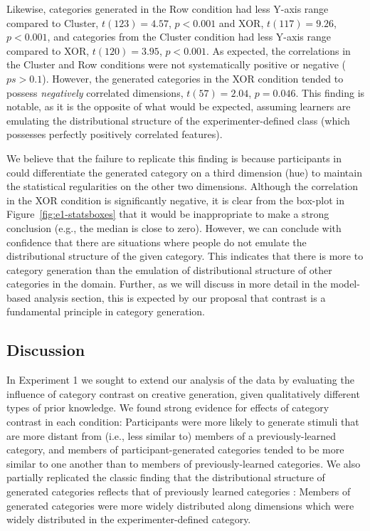 \documentclass[12pt]{article}
\begin{document}
\begin{flushleft}
Likewise, categories generated in the Row condition had less Y-axis range compared to Cluster, $t(123) = 4.57$, $p < 0.001$ and XOR, $t(117) = 9.26$, $p < 0.001$, and categories from the Cluster condition had less Y-axis range compared to XOR, $t(120) = 3.95$, $p < 0.001$. As expected, the correlations in the Cluster and Row conditions were not systematically positive or negative ($ps > 0.1$). However, the generated categories in the XOR condition tended to possess {\em negatively} correlated dimensions, $t(57) = 2.04$, $p = 0.046$. This finding is notable, as it is the opposite of what would be expected, assuming learners are emulating the distributional structure of the experimenter-defined class (which possesses perfectly positively correlated features). 

We believe that the failure to replicate this finding is because participants in \cite{jern2013probabilistic} could differentiate the generated category on a third dimension (hue) to maintain the statistical regularities on the other two dimensions. Although the correlation in the XOR condition is significantly negative, it is clear from the box-plot in Figure~\ref{fig:e1-statsboxes} that it would be inappropriate to make a strong conclusion (e.g., the median is close to zero). However, we can conclude with confidence that there are situations where people do not emulate the distributional structure of the given category. This indicates that there is more to category generation than the emulation of distributional structure of other categories in the domain. Further, as we will discuss in more detail in the model-based analysis section, this is expected by our proposal that contrast is a fundamental principle in category generation.


\subsection{Discussion}
In Experiment 1 we sought to extend our analysis of the \cite{jern2013probabilistic} data by evaluating the influence of category contrast on creative generation, given qualitatively different types of prior knowledge. We found strong evidence for effects of category contrast in each condition: Participants were more likely to generate stimuli that are more distant from (i.e., less similar to) members of a previously-learned category, and members of participant-generated categories tended to be more similar to one another than to members of previously-learned categories. We also partially replicated the classic finding that the distributional structure of generated categories reflects that of previously learned categories \citep{jern2013probabilistic,ward1994structured}: Members of generated categories were more widely distributed along dimensions which were widely distributed in the experimenter-defined category. 


\end{flushleft}
\end{document}
